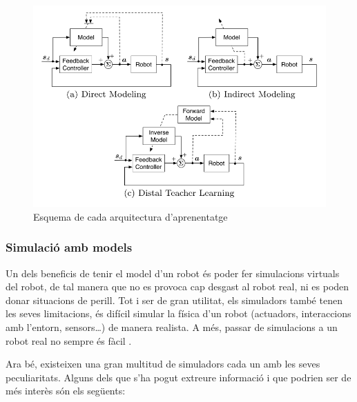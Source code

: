 \documentclass[12pt,a4paper,final,twoside]{report}
\begin{document}
\begin{figure}[tb]
\begin{center}
\includegraphics[scale=0.5]{Imatges/arquitectures-d'aprenentatge.png}
\caption{Esquema de cada arquitectura d'aprenentatge \cite{Nguyen-Tuong2011}\label{fig:esquema-arquitectures-models}}
\end{center}
\end{figure}

\subsubsection{Simulació amb models}

Un dels beneficis de tenir el model d'un robot és poder fer simulacions virtuals del robot, de tal manera que no es provoca cap desgast al robot real, ni es poden donar situacions de perill. Tot i ser de gran utilitat, els simuladors també tenen les seves limitacions, és difícil simular la física d'un robot (actuadors, interaccions amb l'entorn, sensors\dots) de manera realista. A més, passar de simulacions a un robot real no sempre és fàcil \cite{Hohl2006}.

Ara bé, existeixen una gran multitud de simuladors cada un amb les seves peculiaritats. Alguns dels que s'ha pogut extreure informació i que podrien ser de més interès són els següents:
\end{document}
